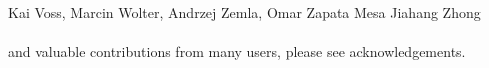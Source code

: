 \begin{center}
{Kai Voss, %
Marcin Wolter, %
Andrzej Zemla, %
Omar Zapata Mesa
Jiahang Zhong %
\\
\hspace{0.5cm} \\
and valuable contributions from many users, please see acknowledgements.
}
\end{center}

\thispagestyle{empty}
\newpage

